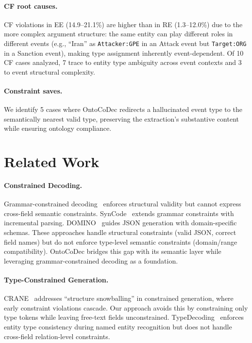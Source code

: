 \documentclass[11pt]{article}
\newcommand{\sys}{OntoCoDec}
\begin{document}
\paragraph{CF root causes.}
CF violations in EE (14.9--21.1\%) are higher than in RE (1.3--12.0\%) due to the more complex argument structure: the same entity can play different roles in different events (e.g., ``Iran'' as \texttt{Attacker:GPE} in an Attack event but \texttt{Target:ORG} in a Sanction event), making type assignment inherently event-dependent.
Of 10 CF cases analyzed, 7 trace to entity type ambiguity across event contexts and 3 to event structural complexity.

\paragraph{Constraint saves.}
We identify 5 cases where \sys{} redirects a hallucinated event type to the semantically nearest valid type, preserving the extraction's substantive content while ensuring ontology compliance.

\section{Related Work}
\label{sec:related}

\paragraph{Constrained Decoding.}
Grammar-constrained decoding~\cite{dong2024xgrammar,willard2023efficient} enforces structural validity but cannot express cross-field semantic constraints.
SynCode~\cite{ugare2024syncode} extends grammar constraints with incremental parsing.
DOMINO~\cite{beurer2024domino} guides JSON generation with domain-specific schemas.
These approaches handle structural constraints (valid JSON, correct field names) but do not enforce type-level semantic constraints (domain/range compatibility).
\sys{} bridges this gap with its semantic layer while leveraging grammar-constrained decoding as a foundation.

\paragraph{Type-Constrained Generation.}
CRANE~\cite{zheng2024crane} addresses ``structure snowballing'' in constrained generation, where early constraint violations cascade.
Our approach avoids this by constraining only type tokens while leaving free-text fields unconstrained.
TypeDecoding~\cite{wang2024typedecoding} enforces entity type consistency during named entity recognition but does not handle cross-field relation-level constraints.
\end{document}
